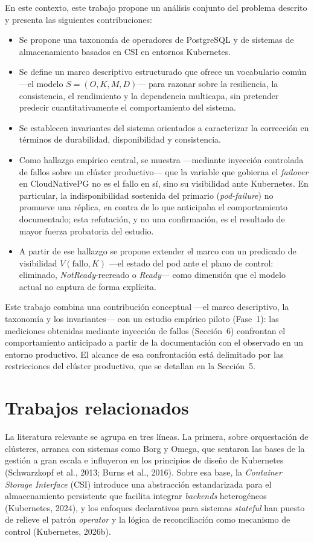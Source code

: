 \documentclass[12pt,twocolumn,letterpaper]{article}
\begin{document}
En este contexto, este trabajo propone un análisis conjunto del problema descrito y presenta las siguientes contribuciones:
\begin{itemize}[leftmargin=1.2em,itemsep=2pt,topsep=2pt]
\item Se propone una taxonomía de operadores de PostgreSQL y de sistemas de almacenamiento basados en CSI en entornos Kubernetes.
\item Se define un marco descriptivo estructurado que ofrece un vocabulario común —el modelo $S=(O,K,M,D)$— para razonar sobre la resiliencia, la consistencia, el rendimiento y la dependencia multicapa, sin pretender predecir cuantitativamente el comportamiento del sistema.
\item Se establecen invariantes del sistema orientados a caracterizar la corrección en términos de durabilidad, disponibilidad y consistencia.
\item Como hallazgo empírico central, se muestra —mediante inyección controlada de fallos sobre un clúster productivo— que la variable que gobierna el \textit{failover} en CloudNativePG no es el fallo en sí, sino su visibilidad ante Kubernetes. En particular, la indisponibilidad sostenida del primario (\textit{pod-failure}) no promueve una réplica, en contra de lo que anticipaba el comportamiento documentado; esta refutación, y no una confirmación, es el resultado de mayor fuerza probatoria del estudio.
\item A partir de ese hallazgo se propone extender el marco con un predicado de visibilidad $V(\text{fallo},K)$ —el estado del pod ante el plano de control: eliminado, \textit{NotReady}-recreado o \textit{Ready}— como dimensión que el modelo actual no captura de forma explícita.
\end{itemize}

Este trabajo combina una contribución conceptual —el marco descriptivo, la taxonomía y los invariantes— con un estudio empírico piloto (Fase~1): las mediciones obtenidas mediante inyección de fallos (Sección~6) confrontan el comportamiento anticipado a partir de la documentación con el observado en un entorno productivo. El alcance de esa confrontación está delimitado por las restricciones del clúster productivo, que se detallan en la Sección~5.

\section{Trabajos relacionados}
La literatura relevante se agrupa en tres líneas. La primera, sobre orquestación de clústeres, arranca con sistemas como Borg y Omega, que sentaron las bases de la gestión a gran escala e influyeron en los principios de diseño de Kubernetes (Schwarzkopf et al., 2013; Burns et al., 2016). Sobre esa base, la \textit{Container Storage Interface} (CSI) introduce una abstracción estandarizada para el almacenamiento persistente que facilita integrar \textit{backends} heterogéneos (Kubernetes, 2024), y los enfoques declarativos para sistemas \textit{stateful} han puesto de relieve el patrón \textit{operator} y la lógica de reconciliación como mecanismo de control (Kubernetes, 2026b).
\end{document}
